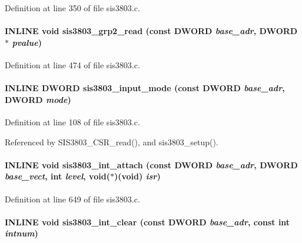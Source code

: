 Definition at line 350 of file sis3803.c.
\paragraph[{sis3803\_\-grp2\_\-read}]{\setlength{\rightskip}{0pt plus 5cm}INLINE void sis3803\_\-grp2\_\-read (const {\bf DWORD} {\em base\_\-adr}, \/  {\bf DWORD} $\ast$ {\em pvalue})}\hfill\label{sis3803_8c_a4d46ce0902c7bcb72dd7ed88c3fe47c6}


Definition at line 474 of file sis3803.c.
\paragraph[{sis3803\_\-input\_\-mode}]{\setlength{\rightskip}{0pt plus 5cm}INLINE {\bf DWORD} sis3803\_\-input\_\-mode (const {\bf DWORD} {\em base\_\-adr}, \/  {\bf DWORD} {\em mode})}\hfill\label{sis3803_8c_ad68630e551f953933a4dde5b8c1b764c}


Definition at line 108 of file sis3803.c.

Referenced by SIS3803\_\-CSR\_\-read(), and sis3803\_\-setup().
\paragraph[{sis3803\_\-int\_\-attach}]{\setlength{\rightskip}{0pt plus 5cm}INLINE void sis3803\_\-int\_\-attach (const {\bf DWORD} {\em base\_\-adr}, \/  {\bf DWORD} {\em base\_\-vect}, \/  int {\em level}, \/  void($\ast$)(void) {\em isr})}\hfill\label{sis3803_8c_a6e11cff7804adfe841ff951446331893}


Definition at line 649 of file sis3803.c.
\paragraph[{sis3803\_\-int\_\-clear}]{\setlength{\rightskip}{0pt plus 5cm}INLINE void sis3803\_\-int\_\-clear (const {\bf DWORD} {\em base\_\-adr}, \/  const int {\em intnum})}\hfill\label{sis3803_8c_ab3c03e7265aa3909a15a945a44255fd1}


